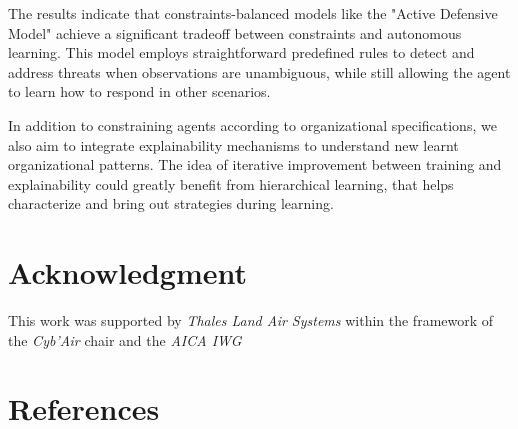 \documentclass[conference]{IEEEtran}
\begin{document}
The results indicate that constraints-balanced models like the "Active Defensive Model" achieve a significant tradeoff between constraints and autonomous learning. This model employs straightforward predefined rules to detect and address threats when observations are unambiguous, while still allowing the agent to learn how to respond in other scenarios.

In addition to constraining agents according to organizational specifications, we also aim to integrate explainability mechanisms to understand new learnt organizational patterns. The idea of iterative improvement between training and explainability could greatly benefit from hierarchical learning, that helps characterize and bring out strategies during learning.




\section*{Acknowledgment}

This work was supported by \emph{Thales Land Air Systems} within the framework of the \emph{Cyb'Air} chair and the \emph{AICA IWG}

\section*{References}

% 



\end{document}
